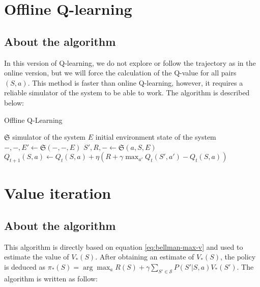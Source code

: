\documentclass[
  a4paper, xcolor = usenames,dvipsnames]{article}
\begin{document}
\hypertarget{offline-q-learning}{%
\section{Offline Q-learning}\label{offline-q-learning}}

\hypertarget{about-the-algorithm-1}{%
\subsection{About the algorithm}\label{about-the-algorithm-1}}

In this version of Q-learning, we do not explore or follow the trajectory as in the online version, but we will force the calculation of the Q-value for all pairs \((S, a)\). This method is faster than online Q-learning, however, it requires a reliable simulator of the system to be able to work. The algorithm is described below:

\begin{algorithm}
\caption{Offline Q-Learning}\label{alg:off-q-learning}
$\mathfrak{S}$ simulator of the system\;
$E$ initial environment state of the system\;
 {
  $ -, -, E' \gets \mathfrak{S}(-, -, E)$\;
   {
     {
      $S', R, - \gets \mathfrak{S}(a, S, E)$\;
      $Q_{t+1}(S, a) \gets Q_{t}(S, a) + \eta (R + \gamma \max_{a'} Q_{t}(S', a') - Q_{t}(S, a))$\;
    }
  }
}
\end{algorithm}

\hypertarget{value-iteration}{%
\section{Value iteration}\label{value-iteration}}

\hypertarget{about-the-algorithm-2}{%
\subsection{About the algorithm}\label{about-the-algorithm-2}}

This algorithm is directly based on equation \eqref{eq:bellman-max-v} and used to estimate the value of \(V_{*}(S)\). After obtaining an estimate of \(V_{*}(S)\), the policy is deduced as \(\pi_{*}(S) = \arg\max_{a} R(S) + \gamma \sum_{S' \in \mathcal{S}} P(S' | S, a) V_{*}(S')\). The algorithm is written as follow:
\end{document}
